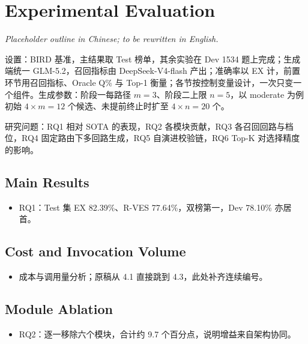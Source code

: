 \section{Experimental Evaluation}
\label{sec:experiments}

\begin{zhoutline}
\textit{Placeholder outline in Chinese; to be rewritten in English.}

设置：BIRD 基准，主结果取 Test 榜单，其余实验在 Dev 1534 题上完成；生成端统一 GLM-5.2，召回指标由 DeepSeek-V4-flash 产出；准确率以 EX 计，前置环节用召回指标、Oracle Q\% 与 Top-1 衡量；各节按控制变量设计，一次只变一个组件。生成参数：阶段一每路径 $m=3$、阶段二上限 $n=5$，以 moderate 为例初始 $4\times m=12$ 个候选、未提前终止时扩至 $4\times n=20$ 个。

研究问题：RQ1 相对 SOTA 的表现，RQ2 各模块贡献，RQ3 各召回回路与档位，RQ4 固定路由下多回路生成，RQ5 自演进校验链，RQ6 Top-K 对选择精度的影响。
\end{zhoutline}

\subsection{Main Results}
\label{sec:exp-main}

\begin{zhoutline}
\begin{itemize}
\item RQ1：Test 集 EX 82.39\%、R-VES 77.64\%，双榜第一，Dev 78.10\% 亦居首。
\end{itemize}
\end{zhoutline}

\subsection{Cost and Invocation Volume}
\label{sec:exp-cost}

\begin{zhoutline}
\begin{itemize}
\item 成本与调用量分析；原稿从 4.1 直接跳到 4.3，此处补齐连续编号。
\end{itemize}
\end{zhoutline}

\subsection{Module Ablation}
\label{sec:exp-module}

\begin{zhoutline}
\begin{itemize}
\item RQ2：逐一移除六个模块，合计约 9.7 个百分点，说明增益来自架构协同。
\end{itemize}
\end{zhoutline}

